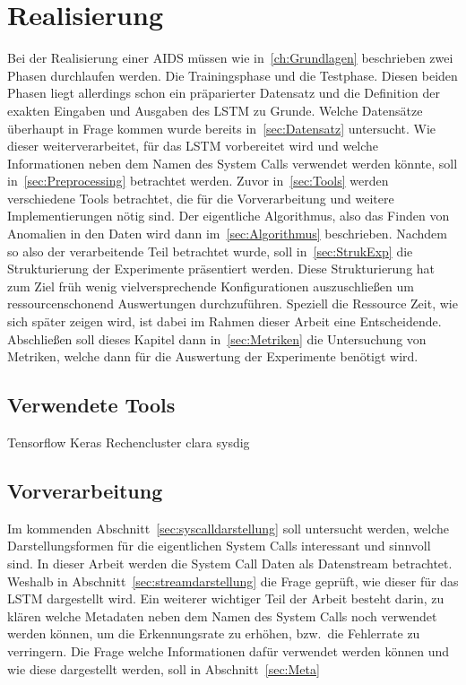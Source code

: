 
\chapter{Realisierung}\label{ch:Realisierung}
    Bei der Realisierung einer AIDS müssen wie in~\autoref{ch:Grundlagen} beschrieben zwei Phasen durchlaufen werden.
    Die Trainingsphase und die Testphase.
    Diesen beiden Phasen liegt allerdings schon ein präparierter Datensatz und die Definition der exakten Eingaben und Ausgaben des \ac{LSTM} zu Grunde. 
    Welche Datensätze überhaupt in Frage kommen wurde bereits in~\autoref{sec:Datensatz} untersucht.
    Wie dieser weiterverarbeitet, für das \ac{LSTM} vorbereitet wird und welche Informationen neben dem Namen des System Calls verwendet werden könnte, 
    soll in~\autoref{sec:Preprocessing} betrachtet werden.
    Zuvor in~\autoref{sec:Tools} werden verschiedene Tools betrachtet, die für die Vorverarbeitung und weitere Implementierungen nötig sind.
    Der eigentliche Algorithmus, also das Finden von Anomalien in den Daten wird dann im~\autoref{sec:Algorithmus} beschrieben.
    Nachdem so also der verarbeitende Teil betrachtet wurde, soll in~\autoref{sec:StrukExp} die Strukturierung der Experimente präsentiert werden.
    Diese Strukturierung hat zum Ziel früh wenig vielversprechende Konfigurationen auszuschließen um ressourcenschonend Auswertungen durchzuführen.
    Speziell die Ressource Zeit, wie sich später zeigen wird, ist dabei im Rahmen dieser Arbeit eine Entscheidende.
    Abschließen soll dieses Kapitel dann in~\autoref{sec:Metriken} die Untersuchung von Metriken, welche dann für die Auswertung der Experimente benötigt wird.



    \section{Verwendete Tools}\label{sec:Tools}
        Tensorflow Keras
        Rechencluster clara
        sysdig

    \section{Vorverarbeitung}\label{sec:Preprocessing}
        Im kommenden Abschnitt~\ref{sec:syscalldarstellung} soll untersucht werden, welche Darstellungsformen für die eigentlichen System Calls interessant und sinnvoll sind.
        In dieser Arbeit werden die System Call Daten als Datenstream betrachtet.
        Weshalb in Abschnitt~\ref{sec:streamdarstellung} die Frage geprüft, wie dieser für das \ac{LSTM} dargestellt wird.
        Ein weiterer wichtiger Teil der Arbeit besteht darin, zu klären welche Metadaten neben dem Namen des System Calls noch verwendet werden können,
        um die Erkennungsrate zu erhöhen, bzw.\ die Fehlerrate zu verringern.
        Die Frage welche Informationen dafür verwendet werden können und wie diese dargestellt werden, soll in Abschnitt~\ref{sec:Meta}

